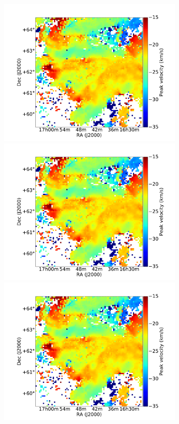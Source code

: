 \documentclass[traditabstract]{aa}
\begin{document}
\begin{figure}[h]
  \centering
  \includegraphics[page=1,height=7.5cm,trim=55 5 55 35,clip=true]{Figures/GHIGLS_velo.pdf}
  \hspace{3mm}                                
  \includegraphics[page=4,height=7.5cm,trim=55 5 55 35,clip=true]{Figures/GHIGLS_velo.pdf} \\
  \vspace{3mm}                                
  \includegraphics[page=2,height=7.5cm,trim=55 5 55 35,clip=true]{Figures/GHIGLS_velo.pdf}

\end{figure}
\end{document}
